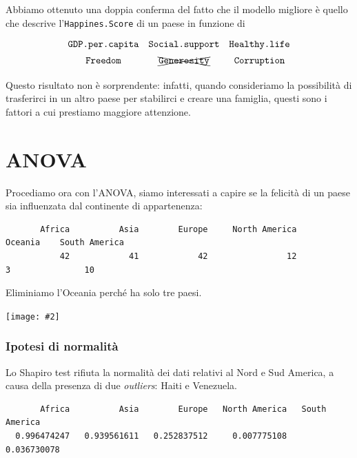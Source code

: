 \documentclass{beamer}
\newcommand{\fg}[2]{%
  \begin{center}
      \texttt{[image: \#2]}%
  \end{center}
}
\begin{document}
\begin{frame}
    Abbiamo ottenuto una doppia conferma del fatto che il modello migliore è quello che descrive l'\texttt{Happines.Score} di un paese in funzione di 
    \begin{equation*}
    {\renewcommand*{\arraystretch}{1.4}
    \begin{array}{ccc}
    {\texttt{GDP.per.capita}} & {\texttt{Social.support}} & {\texttt{Healthy.life}} \\
    {\texttt{Freedom}}        & \xcancel{\texttt{Generosity}}     & {\texttt{Corruption}}
    \end{array}}
    \end{equation*}

    Questo risultato non è sorprendente: infatti, quando consideriamo la possibilità di trasferirci in un altro paese per stabilirci e creare una famiglia, questi sono i fattori a cui prestiamo maggiore attenzione.
\end{frame}


\section{ANOVA}

\begin{frame}[fragile]
    Procediamo ora con l'ANOVA, siamo interessati a capire se la felicità di un paese sia influenzata dal continente di appartenenza:
    \tiny
    \begin{verbatim}
       Africa          Asia        Europe     North America       Oceania    South America 
           42            41            42                12             3               10
    \end{verbatim}
    \normalsize
    Eliminiamo l'Oceania perché ha solo tre paesi.
\end{frame}

\begin{frame}
    \fg{1}{box1}
\end{frame}

\begin{frame}[fragile]
    \frametitle{Ipotesi di normalità}
    Lo Shapiro test rifiuta la normalità dei dati relativi al Nord e Sud America, a causa della presenza di due \textit{outliers}: Haiti e Venezuela.

    \tiny
    \begin{verbatim}
       Africa          Asia        Europe   North America   South America 
  0.996474247   0.939561611   0.252837512     0.007775108     0.036730078 
    \end{verbatim}

\end{frame}
\end{document}
